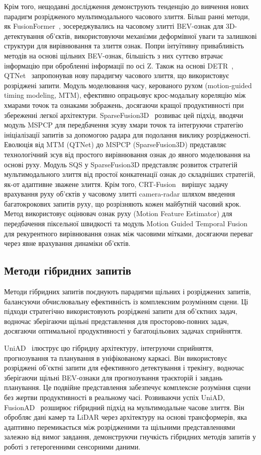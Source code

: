 Крім того, нещодавні дослідження демонструють тенденцію до вивчення нових парадигм розрідженого мультимодального часового злиття. Більш ранні методи, як FusionFormer~\cite{cai2024fusionformer}, зосереджувались на часовому злитті BEV-ознак для 3D-детектування об'єктів, використовуючи механізми деформівної уваги та залишкові структури для вирівнювання та злиття ознак.
Попри інтуїтивну привабливість методів на основі щільних BEV-ознак, більшість з них суттєво втрачає інформацію при обробленні інформації по осі Z.
Також на основі DETR~\cite{wang2022detr3d}, QTNet~\cite{hou2023query} запропонував нову парадигму часового злиття, що використовує розріджені запити. Модуль моделювання часу, керованого рухом (motion-guided timing modeling, MTM), ефективно опрацьовує крос-модальну кореляцію між хмарами точок та ознаками зображень, досягаючи кращої продуктивності при збереженні легкої архітектури. SparseFusion3D~\cite{10314799} розвиває цей підхід, вводячи модуль MSPCP для передбачення зсуву хмари точок та інтегруючи стратегію ініціалізації запитів за допомогою радара для подолання виклику розрідженості. Еволюція від MTM (QTNet) до MSPCP (SparseFusion3D) представляє технологічний зсув від простого вирівнювання ознак до явного моделювання на основі руху. Модуль SQS у SparseFusion3D представляє розвиток стратегій мультимодального злиття від простої конкатенації ознак до складніших стратегій, як-от адаптивне зважене злиття.
Крім того, CRT-Fusion~\cite{kim2024crt} вирішує задачу врахування руху об'єктів у часовому злитті camera-radar шляхом введення багатокрокових запитів руху, що розрізняють кожен майбутній часовий крок. Метод використовує оцінювач ознак руху (Motion Feature Estimator) для передбачення піксельної швидкості та модуль Motion Guided Temporal Fusion для рекурентного вирівнювання ознак між часовими мітками, досягаючи переваг через явне врахування динаміки об'єктів.

\subsection{Методи гібридних запитів}
Методи гібридних запитів поєднують парадигми щільних і розріджених запитів, балансуючи обчислювальну ефективність із комплексним розумінням сцени. Ці підходи стратегічно використовують розріджені запити для об'єктних задач, водночас зберігаючи щільні представлення для просторово-повних задач, досягаючи оптимальної продуктивності у багатоцільових задачах сприйняття.

UniAD~\cite{hu2023planning} ілюструє цю гібридну архітектуру, інтегруючи сприйняття, прогнозування та планування в уніфікованому каркасі. Він використовує розріджені об'єктні запити для ефективного детектування і трекінгу, водночас зберігаючи щільні BEV-ознаки для прогнозування траєкторій і завдань планування. Це подвійне представлення забезпечує комплексне розуміння сцени без жертви продуктивності в реальному часі.
Розвиваючи успіх UniAD, FusionAD~\cite{ye2023fusionad} розширює гібридний підхід на мультимодальне часове злиття. Він обробляє дані камер та LiDAR через архітектуру на основі трансформерів, яка адаптивно перемикається між розрідженими та щільними представленнями залежно від вимог завдання, демонструючи гнучкість гібридних методів запитів у роботі з гетерогенними сенсорними даними.

